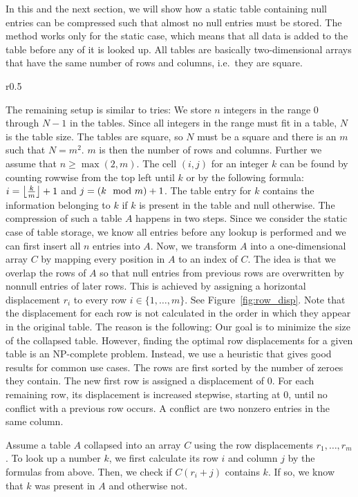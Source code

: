 In this and the next section, we will show how a static table containing null entries can be compressed such that almost no null entries must be stored.
The method works only for the static case, which means that all data is added to the table before any of it is looked up.
All tables are basically two-dimensional arrays that have the same number of rows and columns, i.e.\ they are square.

\begin{wrapfigure}{r}{0.5\textwidth}
  
	\caption{ \small Rows of a table displaced and collapsed into a one-dimensional array. \label{fig:row_disp}}
\end{wrapfigure}

The remaining setup is similar to tries:
We store $n$ integers in the range $0$ through $N - 1$ in the tables.
Since all integers in the range must fit in a table, $N$ is the table size.
The tables are square, so $N$ must be a square and there is an $m$ such that $N = m^2$.
$m$ is then the number of rows and columns.
Further we assume that $n \geq \max(2, m)$.
The cell $(i, j)$ for an integer $k$ can be found by counting rowwise from the top left until $k$ or by the following formula: $i = \left\lfloor \frac{k}{m} \right\rfloor + 1$ and $j = \left( k \mod m \right) + 1$.
The table entry for $k$ contains the information belonging to $k$ if $k$ is present in the table and null otherwise.
The compression of such a table $A$ happens in two steps.
Since we consider the static case of table storage, we know all entries before any lookup is performed and we can first insert all $n$ entries into $A$.
Now, we transform $A$ into a one-dimensional array $C$ by mapping every position in $A$ to an index of $C$.
The idea is that we overlap the rows of $A$ so that null entries from previous rows are overwritten by nonnull entries of later rows.
This is achieved by assigning a horizontal displacement $r_i$ to every row $i \in \{ 1, \ldots, m \}$.
See Figure~\ref{fig:row_disp}.
Note that the displacement for each row is not calculated in the order in which they appear in the original table.
The reason is the following:
Our goal is to minimize the size of the collapsed table.
However, finding the optimal row displacements for a given table is an NP-complete problem.
Instead, we use a heuristic that gives good results for common use cases.
The rows are first sorted by the number of zeroes they contain.
The new first row is assigned a displacement of 0.
For each remaining row, its displacement is increased stepwise, starting at 0, until no conflict with a previous row occurs.
A conflict are two nonzero entries in the same column.

Assume a table $A$ collapsed into an array $C$ using the row displacements $r_1, \ldots, r_m$.
To look up a number $k$, we first calculate its row $i$ and column $j$ by the formulas from above.
Then, we check if $C( r_i + j )$ contains $k$.
If so, we know that $k$ was present in $A$ and otherwise not.

